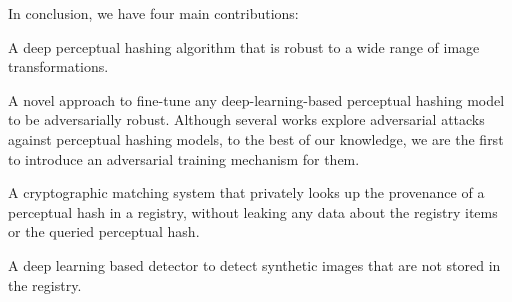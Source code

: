 \noindent In conclusion, we have four main contributions:
\begin{compactenum}
    \item A deep perceptual hashing algorithm that is robust to a wide range of image transformations.
    \item A novel approach to fine-tune any deep-learning-based perceptual hashing model to be adversarially robust. Although several works explore adversarial attacks against perceptual hashing models, to the best of our knowledge, we are the first to introduce an adversarial training mechanism for them.
    \item A cryptographic matching system that privately looks up the provenance of a perceptual hash in a registry, without leaking any data about the registry items or the queried perceptual hash.
    \item A deep learning based detector to detect synthetic images that are not stored in the registry.
\end{compactenum}
